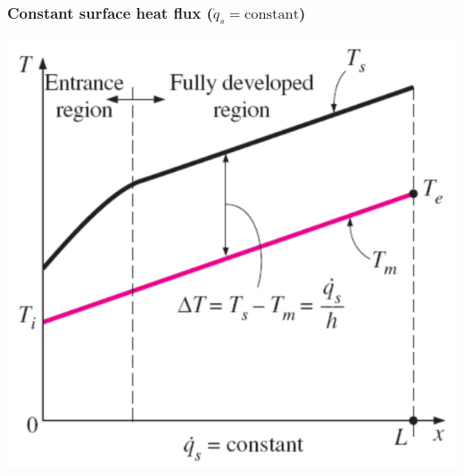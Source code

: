 \documentclass[11pt]{article}
\begin{document}
\subsubsection{Constant surface heat flux (\(\dot{q}_s = \text{constant}\))}
\label{sec:orgb919a2f}
\begin{center}
\includegraphics[width=.9\linewidth]{./images/constant-surface-heat-flux-graph.png}
\end{center}
\end{document}
